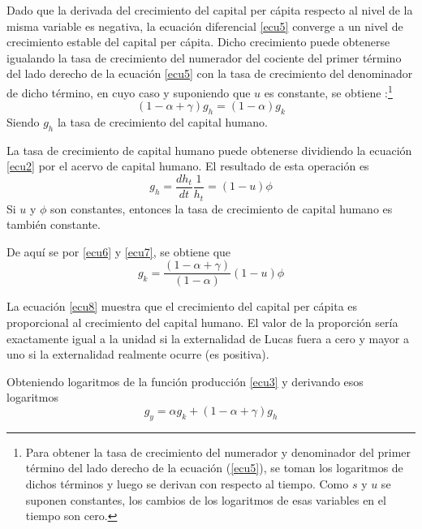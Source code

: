 \documentclass[12pt,notitlepage]{report}
\begin{document}
	Dado que la derivada del crecimiento del capital per cápita respecto al nivel de la misma variable es negativa, la ecuación diferencial \ref{ecu5} converge a un nivel de crecimiento estable  del capital per cápita. Dicho crecimiento puede obtenerse igualando la tasa de crecimiento del numerador del cociente del primer término del lado derecho de la ecuación \ref{ecu5} con la tasa de crecimiento del denominador de dicho término, en cuyo caso y suponiendo que $u$ es constante, se obtiene :\footnote{Para obtener la tasa de crecimiento del numerador y denominador del primer término del lado derecho de la ecuación (\ref{ecu5}), se toman los logaritmos de dichos términos y luego se derivan con respecto al tiempo. Como $s$ y $u$ se suponen constantes, los cambios de los logaritmos de esas variables en el tiempo son cero.}
	\begin{equation}\label{ecu6}
		(1-\alpha + \gamma)g_h=(1-\alpha)g_k
	\end{equation}
	Siendo $g_h$ la tasa de crecimiento del capital humano.
	
	La tasa de crecimiento de capital humano puede obtenerse dividiendo la ecuación \ref{ecu2} por el acervo de capital humano. El resultado de esta operación es
	\begin{equation}\label{ecu7}
		g_h=\frac{dh_t}{dt}\frac{1}{h_t}=(1-u)\phi
	\end{equation}
	Si $u$ y $\phi$ son constantes, entonces la tasa de crecimiento de capital humano es también constante.
	
	De aquí se por \ref{ecu6} y \ref{ecu7}, se obtiene que
	\begin{equation}\label{ecu8}
		g_k=\frac{(1-\alpha +\gamma)}{(1-\alpha)}(1-u)\phi
	\end{equation}
	
	La ecuación \ref{ecu8} muestra que el crecimiento del capital per cápita es proporcional al crecimiento del capital humano. El valor de la proporción sería exactamente igual a la unidad si la externalidad de Lucas fuera a cero y mayor a uno si la externalidad realmente ocurre (es positiva).
	
	Obteniendo logaritmos de la función producción \ref{ecu3} y derivando esos logaritmos 
	\begin{equation}\label{ecu9}
		g_y=\alpha g_k + (1-\alpha +\gamma)g_h
	\end{equation}
	
\end{document}

